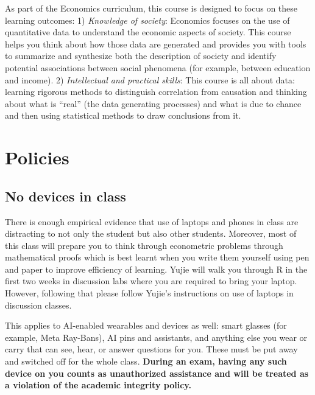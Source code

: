 \documentclass[11pt]{article}
\newcommand{\TAShort}{Yujie}
\begin{document}
As part of the Economics curriculum, this course is designed to focus on these
learning outcomes: 1) \emph{Knowledge of society}: Economics focuses on the use
of quantitative data to understand the economic aspects of society. This course
helps you think about how those data are generated and provides you with tools to
summarize and synthesize both the description of society and identify potential
associations between social phenomena (for example, between education and
income). 2) \emph{Intellectual and practical skills}: This course is all about
data: learning rigorous methods to distinguish correlation from causation and
thinking about what is ``real'' (the data generating processes) and what is due
to chance and then using statistical methods to draw conclusions from it.

\section{Policies}

\subsection{No devices in class}\hspace{0pt}\par
There is enough empirical evidence that use of laptops and phones in class are
distracting to not only the student but also other students. Moreover, most of
this class will prepare you to think through econometric problems through
mathematical proofs which is best learnt when you write them yourself using pen
and paper to improve efficiency of learning. \TAShort{} will walk you through R
in the first two weeks in discussion labs where you are required to bring your
laptop. However, following that please follow \TAShort's instructions on use of
laptops in discussion classes.

This applies to AI-enabled wearables and devices as well: smart glasses (for
example, Meta Ray-Bans), AI pins and assistants, and anything else you wear or
carry that can see, hear, or answer questions for you. These must be put away and
switched off for the whole class. \textbf{During an exam, having any such device
on you counts as unauthorized assistance and will be treated as a violation of
the academic integrity policy.}
\end{document}
